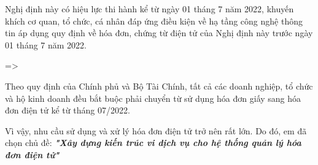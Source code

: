 

Nghị định này có hiệu lực thi hành kể từ ngày 01 tháng 7 năm 2022, khuyến khích cơ quan, tổ chức, cá nhân đáp ứng điều kiện về hạ tầng công nghệ thông tin áp dụng quy định về hóa đơn, chứng từ điện tử của Nghị định này trước ngày 01 tháng 7 năm 2022.



=>

Theo quy định của Chính phủ và Bộ Tài Chính, tất cả các doanh nghiệp, tổ chức và hộ kinh doanh đều bắt buộc phải chuyển từ sử dụng hóa đơn giấy sang hóa đơn điện tử kể từ tháng 07/2022. 

Vì vậy, nhu cầu sử dụng và xử lý hóa đơn điện tử trở nên rất lớn.  Do đó, em đã chọn chủ đề: \textbf{\textit{"Xây dựng kiến trúc vi dịch vụ cho hệ thống quản lý hóa đơn điện tử"}}
